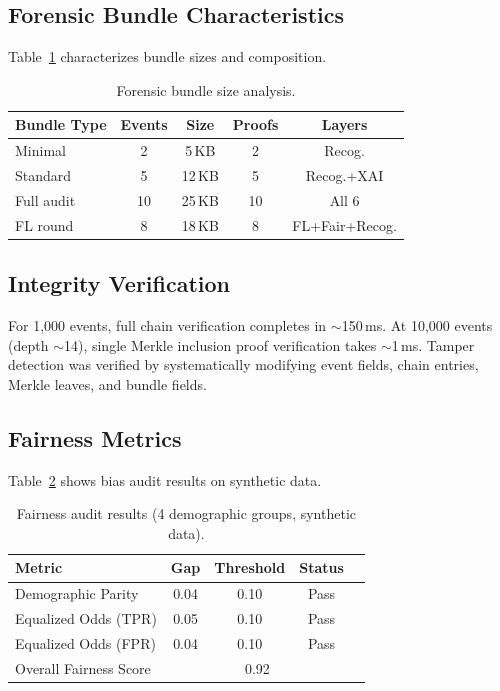 \documentclass[conference]{IEEEtran}
\begin{document}
\subsection{Forensic Bundle Characteristics}

Table~\ref{tab:bundles} characterizes bundle sizes and composition.

\begin{table}[h]
\centering
\caption{Forensic bundle size analysis.}
\label{tab:bundles}
\begin{tabular}{lcccc}
\toprule
\textbf{Bundle Type} & \textbf{Events} & \textbf{Size} & \textbf{Proofs} & \textbf{Layers} \\
\midrule
Minimal & 2 & 5\,KB & 2 & Recog. \\
Standard & 5 & 12\,KB & 5 & Recog.+XAI \\
Full audit & 10 & 25\,KB & 10 & All 6 \\
FL round & 8 & 18\,KB & 8 & FL+Fair+Recog. \\
\bottomrule
\end{tabular}
\end{table}

\subsection{Integrity Verification}

For 1,000 events, full chain verification completes in $\sim$150\,ms. At 10,000 events (depth $\sim$14), single Merkle inclusion proof verification takes $\sim$1\,ms. Tamper detection was verified by systematically modifying event fields, chain entries, Merkle leaves, and bundle fields.

\subsection{Fairness Metrics}

Table~\ref{tab:fairness} shows bias audit results on synthetic data.

\begin{table}[h]
\centering
\caption{Fairness audit results (4 demographic groups, synthetic data).}
\label{tab:fairness}
\begin{tabular}{lcccc}
\toprule
\textbf{Metric} & \textbf{Gap} & \textbf{Threshold} & \textbf{Status} \\
\midrule
Demographic Parity & 0.04 & 0.10 & Pass \\
Equalized Odds (TPR) & 0.05 & 0.10 & Pass \\
Equalized Odds (FPR) & 0.04 & 0.10 & Pass \\
\midrule
Overall Fairness Score & \multicolumn{3}{c}{0.92} \\
\bottomrule
\end{tabular}
\end{table}
\end{document}
